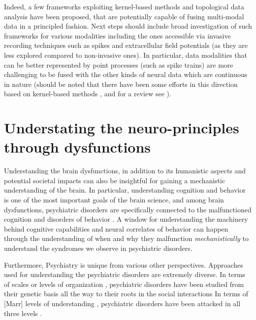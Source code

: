 Indeed, a few frameworks exploiting kernel-based methods \cite{biessmannTemporalKernelCCA2009,murayamaRelationshipNeuralHemodynamic2010,biessmannAnalysisMultimodalNeuroimaging2011,fazliLearningMoreOne2015} and topological data analysis \cite{zhangTopologicalPortraitsMultiscale2020}  have been proposed,
that are potentially capable of fusing multi-modal data in a principled fashion.
Next steps should include broad investigation of such frameworks for various modalities including the ones accessible via invasive recording techniques such as spikes and extracellular field potentials
(as they are less explored compared to non-invasive ones).
In particular, data modalities that can be better represented by point processes (such as spike trains)
are more challenging to be fused with the other kinds of neural data which are continuous in nature 
(should be noted that there have been some efforts in this direction based on kernel-based methods \cite{shpigelmanSpikernelsPredictingArm2005,paivaReproducingKernelHilbert2009b,paivaInnerProductsRepresentation2010,liTensorproductkernelFrameworkMultiscale2014a}, and for a review see \citet{parkKernelMethodsSpike2013a}). 

\section{Understating the neuro-principles through dysfunctions}
Understanding the brain dysfunctions, in addition to its humanistic aspects and potential societal impacts can also be insightful for gaining a mechanistic understanding of the brain.
In particular, understanding cognition and behavior is one of the most important goals of the brain science,
and among brain dysfunctions, psychiatric disorders are specifically connected to the malfunctioned cognition and disorders of behavior \cite{huysAdvancesComputationalUnderstanding2020}.
A window for understanding the machinery behind cognitive capabilities and neural correlates of behavior can happen through the understanding of when and why they malfunction \ie \emph{mechanistically} to understand the syndromes we observe in psychiatric disorders.


Furthermore, Psychiatry is unique from various other perspectives.
Approaches used for understanding the psychiatric disorders are extremely diverse.
In terms of scales or levels of organization \cite[Chapter 1]{churchlandComputationalBrain1992}, 
psychiatric disorders have been studied from their genetic basis 
\cite{burmeisterPsychiatricGeneticsProgress2008,isslerDeterminingRoleMicroRNAs2015,smelandPolygenicArchitectureSchizophrenia2020}
all the way to their roots in the social interactions 
\cite{schilbachSecondpersonNeuropsychiatry2016,leongPromiseTwopersonNeuroscience2019,sevgiSocialBayesUsing2020}
In terms of [Marr] levels of understanding \cite{marrUnderstandingComputationUnderstanding1979}, psychiatric disorders have been attacked in all three levels
\cite[Chapter 5]{redishComputationalPsychiatryNew2016}\cite{huysAdvancesComputationalUnderstanding2020}.

